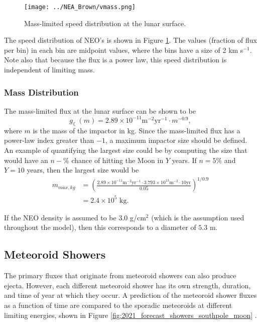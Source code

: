 \documentclass{article}
\begin{document}
\begin{figure}[!htb]
	\centering
	\texttt{[image: ../NEA\_Brown/vmass.png]}
	\caption{Mass-limited speed distribution at the lunar surface.}\label{fig:vmass}
\end{figure}
The speed distribution of NEO's is shown in Figure \ref{fig:vmass}. The values (fraction of flux per bin) in each bin are midpoint values, where the bins have a size of 2 km s$^{-1}$. Note also that because the flux is a power law, this speed distribution is independent of limiting mass.



\subsubsection{Mass Distribution}\label{sssec:NEO:Mass Distribution}


The mass-limited flux at the lunar surface can be shown to be \citep[see,][]{moorhead2020memo}
\begin{equation}\label{eq:NEO_mass_factor_int}
g_\leftmoon (m) = 2.89\times 10^{-11} \text{m}^{-2}\text{yr}^{-1}\cdot m^{-0.9},
\end{equation}
where $m$ is the mass of the impactor in kg. Since the mass-limited flux has a power-law index greater than $-1$, a maximum impactor size should be defined. An example of quantifying the largest size could be by computing the size that would have an $n-\%$ chance of hitting the Moon in $Y$ years. If $n = 5\%$ and $Y = 10$ years, then the largest size would be
\begin{align}
m_{max, kg} &= \left(\frac{2.89 \times 10^{-11} \text{m}^{-2}\text{yr}^{-1} \cdot 3.793\times 10^{13} \text{m}^{-2} \cdot 10 \text{yr}}{0.05}\right)^{1/0.9}\nonumber\\
&= 2.4\times 10^5 \text{ kg}.
\end{align}

If the NEO density is assumed to be $3.0$ g/cm$^2$ (which is the assumption used throughout the model), then this corresponds to a diameter of $5.3$ m.

\clearpage
\subsection{Meteoroid Showers}\label{ssec:Meteoroid Showers}

The primary fluxes that originate from meteoroid showers can also produce ejecta. However, each different meteoroid shower has its own strength, duration, and time of year at which they occur. A prediction of the meteoroid shower fluxes as a function of time are compared to the sporadic meteoroids at different limiting energies, shown in Figure \ref{fig:2021_forecast_showers_southpole_moon} \citep{moorhead2020southpoleshower}.
\end{document}
